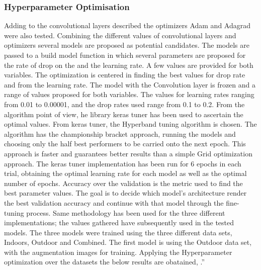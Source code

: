\documentclass[conference]{IEEEtran}
\begin{document}
\subsubsection{Hyperparameter Optimisation}
Adding to the convolutional layers described the optimizers Adam and Adagrad were also tested. Combining the different values of convolutional layers and optimizers several models are proposed as potential candidates. The models are passed to a build model function in which several parameters are proposed for the rate of drop on the and the learning rate. A few values are provided for both variables. The optimization is centered in finding the best values for drop rate and from the learning rate. The model with the Convolution layer is frozen and a range of values proposed for both variables. The values for learning rates ranging from 0.01 to 0.00001, and the drop rates used range from 0.1 to 0.2. From the algorithm point of view, he library keras tuner has been used to ascertain the optimal values. From keras tuner, the Hyperband tuning algorithm is chosen. The algorithm has the championship bracket approach, running the models and choosing only the half best performers to be carried onto the next epoch.  This approach is faster and guarantees better results than a simple Grid optimization approach.  The keras tuner implementation has been run for 6 epochs in each trial, obtaining the optimal learning rate for each model as well as the optimal number of epochs.  Accuracy over the validation is the metric used to find the best parameter values. The goal is to decide which model’s architecture render the best validation accuracy and continue with that model through the fine-tuning process. 
Same methodology has been used for the three different implementations; the values gathered have subsequently used in the tested models. The three models were trained using the three different data sets, Indoors, Outdoor and Combined. The first model is using the Outdoor data set, with the augmentation images for training. 
Applying the Hyperparameter optimization over the datasets the below results are obatained, .''
\end{document}
